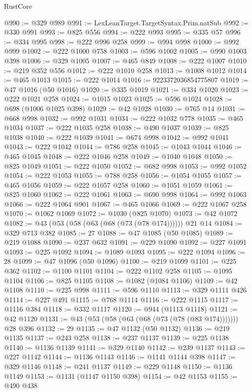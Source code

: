 \begin{lexlean}{RustCore}
\begin{coremodule}
@990 := @329 @989
@991 := LexLeanTarget.TargetSyntax.Prim.natSub
@992 := @330 @991
@993 := @825 @556
@994 := @222 @993
@995 := @335 @57
@996 := @334 @995
@998 := @222 @996 @258
@999 := @994 @998
@1000 := @992 @999
@1002 := @222 @1000 @758
@1003 := @596 @1002
@1005 := @990 @1003 @398
@1006 := @329 @1005
@1007 := @465 @849
@1008 := @222 @1007
@1010 := @219 @352 @556
@1012 := @222 @1010 @258
@1013 := @1008 @1012
@1014 := @465 @1013
@1015 := @222 @1014
@1016 := 9223372036854775807
@1019 := @47 @1016 (@50 @1016)
@1020 := @335 @1019
@1021 := @334 @1020
@1023 := @222 @1021 @258
@1024 := @1015 @1023
@1025 := @596 @1024
@1028 := @698 (@1006 @1025 @398)
@1029 := @42 @1028
@1030 := @765 @14
@1031 := @668 @998
@1032 := @992 @1031
@1034 := @222 @1032 @778
@1035 := @465 @1034
@1037 := @222 @1035 @258
@1038 := @490 @1037
@1039 := @825 @1038
@1040 := @222 @1039
@1041 := @674 @998
@1042 := @992 @1041
@1043 := @222 @1042
@1044 := @786 @258
@1045 := @1043 @1044
@1046 := @465 @1045
@1048 := @222 @1046 @258
@1049 := @1040 @1048
@1050 := @825 @1049
@1051 := @222 @1050
@1052 := @682 @998
@1053 := @992 @1052
@1054 := @222 @1053
@1055 := @788 @258
@1056 := @1054 @1055
@1057 := @465 @1056
@1059 := @222 @1057 @258
@1060 := @1051 @1059
@1061 := @825 @1060
@1062 := @222 @1061
@1063 := @690 @998
@1064 := @992 @1063
@1066 := @222 @1064 @901
@1067 := @465 @1066
@1069 := @222 @1067 @258
@1070 := @1062 @1069
@1072 := @1030 (@825 @1070)
@1073 := @42 @1072
@1082 := @43 (@53 (@58 (@63 (@68 (@73 (@78 @174)))))) @21 @14
@1084 := @329 @713 @382
@1085 := 27
@1088 := @47 @1085 (@50 @1085)
@1089 := @219 @1088
@1090 := @237 @632
@1091 := @229 @1090
@1092 := @227 @1091
@1093 := @225 @1092
@1094 := @1089 @1093
@1095 := @222 @1094
@1096 := 28
@1099 := @47 @1096 (@50 @1096)
@1100 := @219 @1099
@1101 := @225 @362
@1102 := @1100 @1101
@1104 := @222 @1102 @258
@1105 := @1095 @1104
@1106 := @825 @1105
@1108 := @1082 (@1084 @1106)
@1109 := @42 @1108
@1110 := @225 @998
@1111 := @596 @1110
@1113 := @329 @1111 @426
@1114 := @227 @491
@1115 := @768 @1114
@1116 := @222 @1115
@1117 := @1116 @384
@1118 := @332 @1117
@1120 := @944 (@1113 @1118)
@1121 := @42 @1120
@1131 := @43 (@53 (@58 (@63 (@68 (@73 (@78 (@83 @174))))))) @28 @396
@1132 := 29
@1135 := @47 @1132 (@50 @1132)
@1136 := @219 @1135
@1137 := @243 @258
@1138 := @237 @1137
@1139 := @225 @1138
@1140 := @1136 @1139
@1141 := @329 @1140
@1142 := @239 @1137
@1143 := @227 @1142
@1144 := @1136 @1143
@1146 := @1141 @1144 @398
@1147 := @329 @1146
@1148 := @241 @1137
@1149 := @229 @1148
@1150 := @1136 @1149
@1153 := @1131 (@1147 @1150 @398)
@1154 := @42 @1153
@1155 := @490 @438

\end{coremodule}
\end{lexlean}
